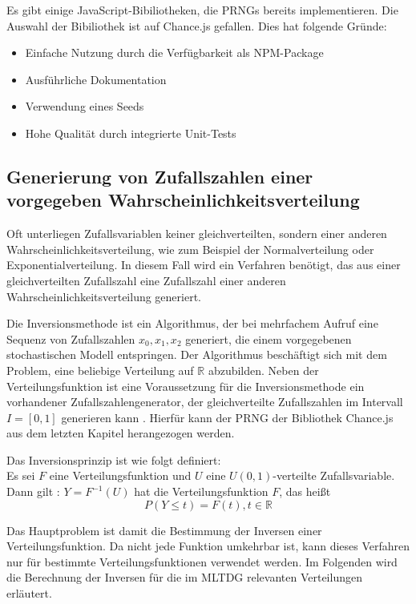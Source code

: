 Es gibt einige JavaScript-Bibiliotheken, die \ac{PRNG}s bereits implementieren. Die Auswahl der Bibiliothek ist auf Chance.js gefallen. Dies hat folgende Gründe:
\begin{itemize}
    \item Einfache Nutzung durch die Verfügbarkeit als NPM-Package
    \item Ausführliche Dokumentation
    \item Verwendung eines Seeds
    \item Hohe Qualität durch integrierte Unit-Tests
\end{itemize}

\subsection{Generierung von Zufallszahlen einer vorgegeben Wahrscheinlichkeitsverteilung}

Oft unterliegen Zufallsvariablen keiner gleichverteilten, sondern einer anderen Wahrscheinlichkeitsverteilung, wie zum Beispiel der Normalverteilung oder Exponentialverteilung. In diesem Fall wird ein Verfahren benötigt, das aus einer gleichverteilten Zufallszahl eine Zufallszahl einer anderen Wahrscheinlichkeitsverteilung generiert.

Die Inversionsmethode ist ein Algorithmus, der bei mehrfachem Aufruf eine Sequenz von Zufallszahlen $x_0, x_1, x_2$ generiert, die einem vorgegebenen stochastischen Modell entspringen. Der Algorithmus beschäftigt sich mit dem Problem, eine beliebige Verteilung auf $\mathbb{R}$ abzubilden. Neben der Verteilungsfunktion ist eine Voraussetzung für die Inversionsmethode ein vorhandener Zufallszahlengenerator, der gleichverteilte Zufallszahlen im Intervall $I=[0,1]$ generieren kann \cite{Inversionsmethode}. Hierfür kann der \ac{PRNG} der Bibliothek Chance.js aus dem letzten Kapitel herangezogen werden.

Das Inversionsprinzip ist wie folgt definiert:\\
Es sei $F$ eine Verteilungsfunktion und $U$ eine $U(0,1)$-verteilte Zufallsvariable.\\
Dann gilt \cite{Inversionsmethode}: $Y = F^{-1}(U)$ hat die Verteilungsfunktion $F$, das heißt
$$P(Y \le t)=F(t),t \in \mathbb{R}$$

Das Hauptproblem ist damit die Bestimmung der Inversen einer Verteilungsfunktion. Da nicht jede Funktion umkehrbar ist, kann dieses Verfahren nur für bestimmte Verteilungsfunktionen verwendet werden. Im Folgenden wird die Berechnung der Inversen für die im \ac{MLTDG} relevanten Verteilungen erläutert.

